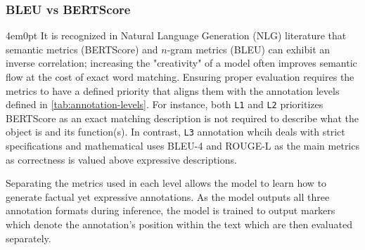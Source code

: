 		\subsubsection{BLEU vs BERTScore}
			\begin{indentedblock}{4em}{0pt}
				It is recognized in Natural Language Generation (NLG) literature that semantic metrics (BERTScore) and $n$-gram metrics (BLEU) can exhibit an inverse correlation; increasing the "creativity" of a model often improves semantic flow at the cost of exact word matching. Ensuring proper evaluation requires the metrics to have a defined priority that aligns them with the annotation levels defined in \autoref{tab:annotation-levels}. For instance, both \texttt{L1} and \texttt{L2} prioritizes BERTScore as an exact matching description is not required to describe what the object is and its function(s). In contrast, \texttt{L3} annotation whcih deals with strict specifications and mathematical uses BLEU-4 and ROUGE-L as the main metrics as correctness is valued above expressive descriptions.
				
				Separating the metrics used in each level allows the model to learn how to generate factual yet expressive annotations. As the model outputs all three annotation formats during inference, the model is trained to output markers which denote the annotation's position within the text which are then evaluated separately.
			\end{indentedblock}
		
\endgroup
